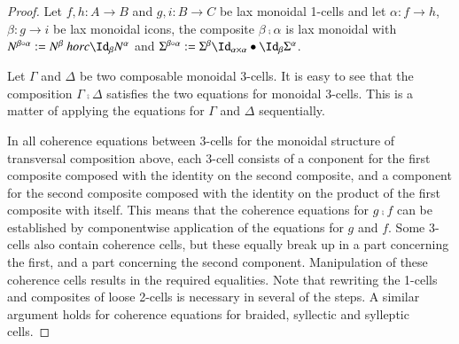 \begin{proof}
Let $f,h: A \rightarrow B $ and $g,i: B \rightarrow C$ be lax monoidal 1-cells and let $\alpha: f \rightarrow h$, $\beta: g \rightarrow i$ be lax monoidal icons, the composite $\beta \comp \alpha$ is lax monoidal with $N^{\beta \comp \alpha}:= N^{\beta} \ horc \looseid_{\beta} N^{\alpha}$ and $\Sigma^{\beta \comp \alpha}:= \Sigma^{\beta}\looseid_{\alpha \times \alpha} \horc \looseid_{\beta} \Sigma^{\alpha}$.




Let $\Gamma$ and $\Delta$ be two composable monoidal 3-cells. It is easy to see that the composition $\Gamma \comp \Delta$ satisfies the two equations for monoidal 3-cells. This is a matter of applying the equations for $\Gamma$ and $\Delta$ sequentially.

In all coherence equations between 3-cells for the monoidal structure of transversal composition above, each 3-cell consists of a conponent for the first composite  composed with the identity on the second composite, and a component for the second composite composed with the identity on the product of the first composite with itself. This means that the coherence equations for $g \comp f$  can be established by componentwise application of the equations for $g$ and $f$. Some 3-cells also contain coherence cells, but these equally break up in a part concerning the first, and a part concerning the second component. Manipulation of these coherence cells results in the required equalities. Note that rewriting the 1-cells and composites of loose 2-cells is necessary in several of the steps. A similar argument holds for coherence equations for braided, syllectic and sylleptic cells.

\end{proof}

